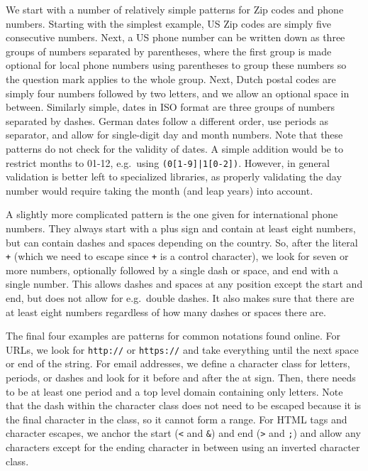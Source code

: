 We start with a number of relatively simple patterns for Zip codes and phone numbers.
Starting with the simplest example, US Zip codes are simply five consecutive numbers.
Next, a US phone number can be written down as three groups of numbers separated by parentheses,
where the first group is made optional for local phone numbers using parentheses to group these numbers so the question mark applies to the whole group.
Next, Dutch postal codes are simply four numbers followed by two letters, and we allow an optional space in between.
Similarly simple, dates in ISO format are three groups of numbers separated by dashes.
German dates follow a different order, use periods as separator, and allow for single-digit day and month numbers.
Note that these patterns do not check for the validity of dates.
A simple addition would be to restrict months to 01-12, e.g.\ using \verb!(0[1-9]|1[0-2])!.
However, in general validation is better left to specialized libraries, as properly validating the day number would require taking the month (and leap years) into account.

A slightly more complicated pattern is the one given for international phone numbers.
They always start with a plus sign and contain at least eight numbers, but can contain dashes and spaces depending on the country.
So, after the literal \verb|+| (which we need to escape since \verb|+| is a control character),
we look for seven or more numbers, optionally followed by a single dash or space, and end with a single number.
This allows dashes and spaces at any position except the start and end, but does not allow for e.g.\ double dashes.
It also makes sure that there are at least eight numbers regardless of how many dashes or spaces there are.

The final four examples are patterns for common notations found online.
For URLs, we look for \texttt{\small{http://}} or \texttt{\small{https://}} and take everything until the next space or end of the string.
For email addresses, we define a character class for letters, periods, or dashes and look for it before and after the at sign.
Then, there needs to be at least one period and a top level domain containing only letters.
Note that the dash within the character class does not need to be escaped because it is the final character in the class, so it cannot form a range.
For HTML tags and character escapes, we anchor the start (\verb|<| and \verb|&|) and end (\verb|>| and \verb|;|) and allow any characters except for the ending character in between
using an inverted character class.

